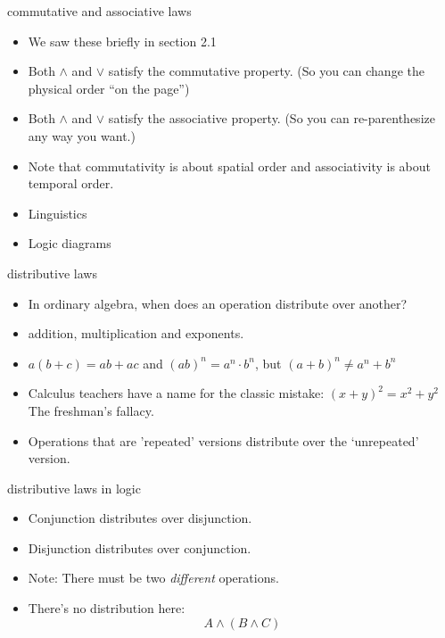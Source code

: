 \documentclass[landscape]{beamer}
\begin{document}
\begin{frame}{commutative and associative laws}
\begin{itemize}
\item We saw these briefly in section 2.1 \pause
\item Both $\land$ and $\lor$ satisfy the commutative property. \pause (So you can change the physical order ``on the page'') \pause
\item Both $\land$ and $\lor$ satisfy the associative property. \pause (So you can re-parenthesize any way you want.) \pause  
\item Note that commutativity is about spatial order and associativity is about temporal order. \pause
\item Linguistics \pause
\item Logic diagrams
\end{itemize}
\end{frame}

\begin{frame}{distributive laws}
\begin{itemize}
\item In ordinary algebra, when does an operation distribute over another? \pause
\item addition, multiplication and exponents. \pause
\item $a(b+c) = ab + ac$ and $(ab)^n = a^n\cdot b^n$, but $(a+b)^n \neq a^n + b^n$ \pause
\item Calculus teachers have a name for the classic mistake: $(x+y)^2 = x^2 + y^2$ \pause \hspace{4ex} The freshman's fallacy. \pause
\item Operations that are 'repeated' versions distribute over the `unrepeated' version. \pause
\end{itemize}
\end{frame}

\begin{frame}{distributive laws in logic}
\begin{itemize}
\item Conjunction distributes over disjunction.\pause
\item Disjunction distributes over conjunction.\pause
\item Note: There must be two {\em different} operations. \pause
\item There's no distribution here:  
\[ A \land (B \land C) \] 
\end{itemize}
\end{frame}
\end{document}
